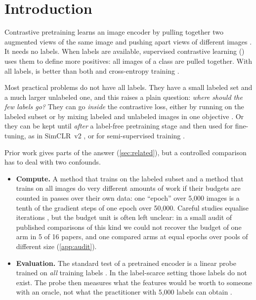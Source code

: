 \section{Introduction}
\label{sec:intro}

Contrastive pretraining learns an image encoder by pulling together two augmented views of the same image
and pushing apart views of different images \citep{chen2020simclr,he2020moco}. It needs no labels. When
labels are available, supervised contrastive learning (\supcon) \citep{khosla2020supcon} uses them to
define more positives: all images of a class are pulled together. With all labels, \supcon is better than
both \simclr and cross-entropy training \citep{khosla2020supcon}.

Most practical problems do not have all labels. They have a small labeled set and a much larger unlabeled
one, and this raises a plain question: \emph{where should the few labels go?} They can go \emph{inside} the
contrastive loss, either by running \supcon on the labeled subset or by mixing labeled and unlabeled images
in one objective \citep{assran2020suncet,inoue2020semi}. Or they can be kept until \emph{after} a
label-free pretraining stage and then used for fine-tuning, as in SimCLR~v2 \citep{chen2020simclrv2}, or
for semi-supervised training \citep{sohn2020fixmatch}.

Prior work gives parts of the answer (\cref{sec:related}), but a controlled comparison has to deal with two
confounds.

\begin{itemize}[leftmargin=1.4em]
\item \textbf{Compute.} A method that trains on the labeled subset and a method that trains on all images do
very different amounts of work if their budgets are counted in passes over their own data: one ``epoch''
over 5,000 images is a tenth of the gradient steps of one epoch over 50,000. Careful studies equalise
iterations \citep{newell2020useful,liu2022self}, but the budget unit is often left unclear: in a small audit
of published comparisons of this kind we could not recover the budget of one arm in 5 of 16 papers, and one
compared arms at equal epochs over pools of different size (\ref{app:audit}).
\item \textbf{Evaluation.} The standard test of a pretrained encoder is a linear probe trained on
\emph{all} training labels \citep{chen2020simclr}. In the label-scarce setting those labels do not exist.
The probe then measures what the features would be worth to someone with an oracle, not what the
practitioner with 5,000 labels can obtain \citep{oliver2018realistic}.
\end{itemize}

